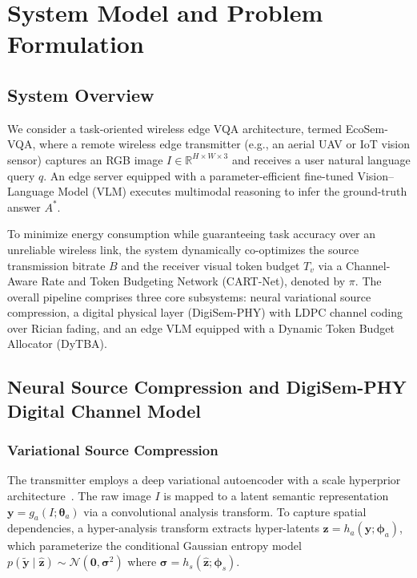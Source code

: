 \section{System Model and Problem Formulation}\label{sec:system}

\subsection{System Overview}
We consider a task-oriented wireless edge VQA architecture, termed EcoSem-VQA, where a remote wireless edge transmitter (e.g., an aerial UAV or IoT vision sensor) captures an RGB image $I \in \mathbb{R}^{H \times W \times 3}$ and receives a user natural language query $q$. An edge server equipped with a parameter-efficient fine-tuned Vision--Language Model (VLM) executes multimodal reasoning to infer the ground-truth answer $A^*$. 

To minimize energy consumption while guaranteeing task accuracy over an unreliable wireless link, the system dynamically co-optimizes the source transmission bitrate $B$ and the receiver visual token budget $T_v$ via a Channel-Aware Rate and Token Budgeting Network (CART-Net), denoted by $\pi$. The overall pipeline comprises three core subsystems: neural variational source compression, a digital physical layer (DigiSem-PHY) with LDPC channel coding over Rician fading, and an edge VLM equipped with a Dynamic Token Budget Allocator (DyTBA).

\subsection{Neural Source Compression and DigiSem-PHY Digital Channel Model}
\subsubsection{Variational Source Compression}
The transmitter employs a deep variational autoencoder with a scale hyperprior architecture~\cite{balle2018variational,begaint2020compressai}. The raw image $I$ is mapped to a latent semantic representation $\mathbf{y} = g_a(I; \boldsymbol{\theta}_a)$ via a convolutional analysis transform. To capture spatial dependencies, a hyper-analysis transform extracts hyper-latents $\mathbf{z} = h_a(\mathbf{y}; \boldsymbol{\phi}_a)$, which parameterize the conditional Gaussian entropy model $p(\mathbf{\tilde y} \mid \mathbf{\hat z}) \sim \mathcal{N}(\mathbf{0}, \boldsymbol{\sigma}^2)$ where $\boldsymbol{\sigma} = h_s(\mathbf{\hat z}; \boldsymbol{\phi}_s)$. 

